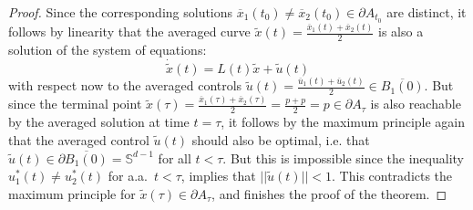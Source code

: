 \documentclass[reqno]{amsart}
\theoremstyle{definition}
\numberwithin{equation}{section}
\begin{document}
\begin{proof}
  Since the corresponding solutions $\overline x_1(t_0)\ne \overline x_2(t_0) \in \partial A_{t_0}$ are distinct, it follows by linearity that the averaged curve $\tilde{x}(t)=\frac{\overline x_1(t)+\overline x_2(t)}{2}$ is also a solution of the system of equations:
  \[\dot{\tilde{x}}(t)=L(t)\tilde{x}+\tilde{u}(t)\]
  with respect now to the averaged controls $\tilde{u}(t)=\frac{\overline u_1(t)+\overline u_2(t)}{2}\in \overline{B_1(0)}$. But since the terminal point $\tilde{x}(\tau)=\frac{\overline x_1(\tau)+\overline x_2(\tau)}{2}=\frac{p+p}{2}=p\in \partial A_{\tau}$ is also reachable by the averaged solution at time $t=\tau$, it follows by the maximum principle again that the averaged control $\tilde{u}(t)$ should also be optimal, i.e. that $\tilde{u}(t)\in \partial \overline{B_1(0)}=\mathbb{S}^{d-1}$ for all $t<\tau$. But this is impossible since the inequality $u_1^*(t)\ne u_2^*(t)$ for a.a.~$t<\tau$, implies that $||\tilde{u}(t)||<1$. This contradicts the maximum principle for $\tilde x(\tau)\in \partial A_{\tau}$, and finishes the proof of the theorem. 
\end{proof}
\end{document}
